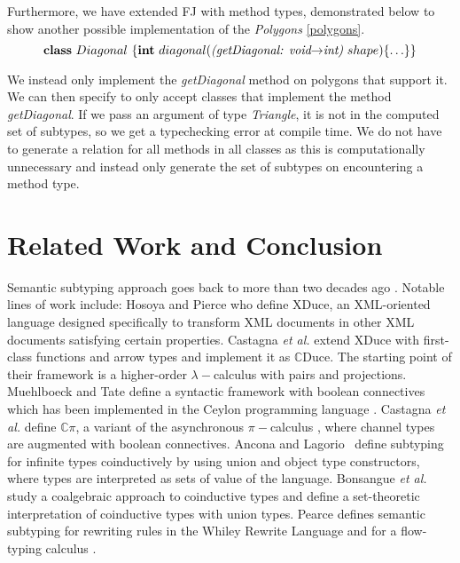 \documentclass[runningheads]{llncs}
\begin{document}
Furthermore, we have extended FJ with method types, demonstrated below to show another possible implementation of the \emph{Polygons} \autoref{polygons}.
$$
    \mathbf{class} \  Diagonal \ \{
    \mathbf{int}\ diagonal(\textit{(getDiagonal: void$\rightarrow$int)}  \ shape)\{\ldots\}
    \}
$$

We instead only implement the \emph{getDiagonal} method on polygons that support it. We can then specify to only accept classes that implement the method \emph{getDiagonal}. If we pass an argument of type \emph{Triangle}, it is not in the computed set of subtypes, so we get a typechecking error at compile time.
We do not have to generate a relation for all methods in all classes as this is computationally unnecessary and instead
only generate the set of subtypes on encountering a method type.


\section{Related Work and Conclusion}
\label{sec:conclusion}
Semantic subtyping approach goes back to more than two decades ago \cite{Aiken,Damm}.
Notable lines of work include:
Hosoya and Pierce \cite{XML1,XML2,XML3} who define XDuce, an XML-oriented language designed specifically to transform XML documents in other XML documents satisfying certain properties.
Castagna \emph{et al.} \cite{gentle,Cas05,FCB08} extend XDuce with first-class functions and arrow types and implement it as $\mathbb{C}$Duce. The starting point of their framework is a higher-order $\lambda-$calculus with pairs and projections.
Muehlboeck and Tate \cite{Muehlboeck2018} define a syntactic framework with boolean connectives which has been implemented in the Ceylon programming language \cite{Ceylon2016}.
Castagna \emph{et al.} \cite{Cpi} define $\mathbb{C}\pi$, a variant of the asynchronous $\pi-$calculus \cite{sangiorgi}, where channel types are augmented with boolean connectives.
Ancona and Lagorio~\cite{AL10} define subtyping for infinite types coinductively by using union and object type constructors, where types are interpreted as sets of value of the language.
Bonsangue \emph{et al.}~\cite{BRABR14} study a coalgebraic approach to coinductive types and define a set-theoretic interpretation of coinductive types with union types.
Pearce \cite{Pearce19} defines semantic subtyping for rewriting rules in the Whiley Rewrite Language and for a flow-typing calculus  \cite{Pearce13}.
\end{document}

